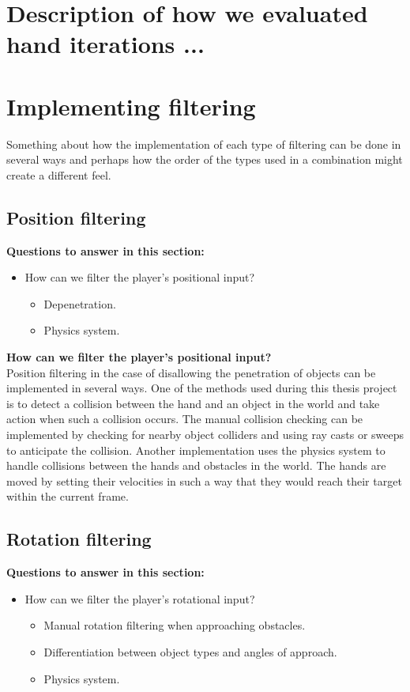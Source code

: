 
\section{Description of how we evaluated hand iterations ...}
\label{sec:DESCRIPTIONOFEVALUATIONSCENARIOS}
\section{Implementing filtering}
\label{sec:implementingFiltering}
Something about how the implementation of each type of filtering can be done in several ways and perhaps how the order of the types used in a combination might create a different feel.

\subsection{Position filtering}
\label{subsec:implementationPositionFiltering}
\textbf{Questions to answer in this section:}
\begin{itemize}
\item How can we filter the player's positional input?
\begin{itemize}
\item Depenetration.
\item Physics system.
\end{itemize}
\end{itemize}

\textbf{How can we filter the player's positional input?}\\
Position filtering in the case of disallowing the penetration of objects can be implemented in several ways. One of the methods used during this thesis project is to detect a collision between the hand and an object in the world and take action when such a collision occurs. The manual collision checking can be implemented by checking for nearby object colliders and using ray casts or sweeps to anticipate the collision.
Another implementation uses the physics system to handle collisions between the hands and obstacles in the world. The hands are moved by setting their velocities in such a way that they would reach their target within the current frame.

\subsection{Rotation filtering}
\label{subsec:implementationRotationFiltering}
\textbf{Questions to answer in this section:}
\begin{itemize}
\item How can we filter the player's rotational input?
\begin{itemize}
\item Manual rotation filtering when approaching obstacles.
\item Differentiation between object types and angles of approach.
\item Physics system.
\end{itemize}
\end{itemize}

